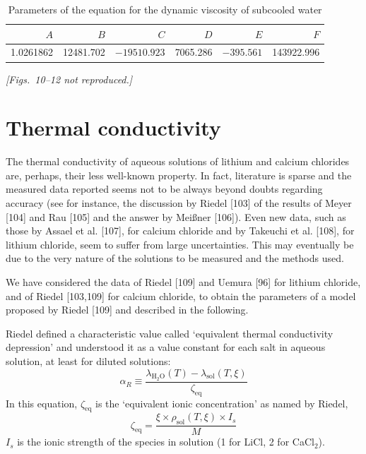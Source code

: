\documentclass[11pt]{article}
\begin{document}
\begin{table}[htbp]
\centering
\caption{Parameters of the equation for the dynamic viscosity of subcooled water}
\begin{tabular}{rrrrrr}
\toprule
$A$ & $B$ & $C$ & $D$ & $E$ & $F$ \\
\midrule
1.0261862 & 12481.702 & $-19510.923$ & 7065.286 & $-395.561$ & 143922.996 \\
\bottomrule
\end{tabular}
\end{table}

\textit{[Figs.~10--12 not reproduced.]}

\section{Thermal conductivity}

The thermal conductivity of aqueous solutions of lithium and calcium chlorides are,
perhaps, their less well-known property. In fact, literature is sparse and the measured
data reported seems not to be always beyond doubts regarding accuracy (see for instance,
the discussion by Riedel [103] of the results of Meyer [104] and Rau [105] and the answer
by Mei{\ss}ner [106]). Even new data, such as those by Assael et al. [107], for calcium
chloride and by Takeuchi et al. [108], for lithium chloride, seem to suffer from large
uncertainties. This may eventually be due to the very nature of the solutions to be
measured and the methods used.

We have considered the data of Riedel [109] and Uemura [96] for lithium chloride, and of
Riedel [103,109] for calcium chloride, to obtain the parameters of a model proposed by
Riedel [109] and described in the following.

Riedel defined a characteristic value called `equivalent thermal conductivity depression'
and understood it as a value constant for each salt in aqueous solution, at least for
diluted solutions:
\begin{equation}
\alpha_R \equiv \frac{\lambda_{\mathrm{H_2O}}(T) - \lambda_{\mathrm{sol}}(T,\xi)}{\zeta_{\mathrm{eq}}}
\end{equation}
In this equation, $\zeta_{\mathrm{eq}}$ is the `equivalent ionic concentration' as named by
Riedel,
\begin{equation}
\zeta_{\mathrm{eq}} = \frac{\xi \times \rho_{\mathrm{sol}}(T,\xi) \times I_s}{M}
\end{equation}
$I_s$ is the ionic strength of the species in solution (1 for LiCl, 2 for CaCl$_2$).
\end{document}

